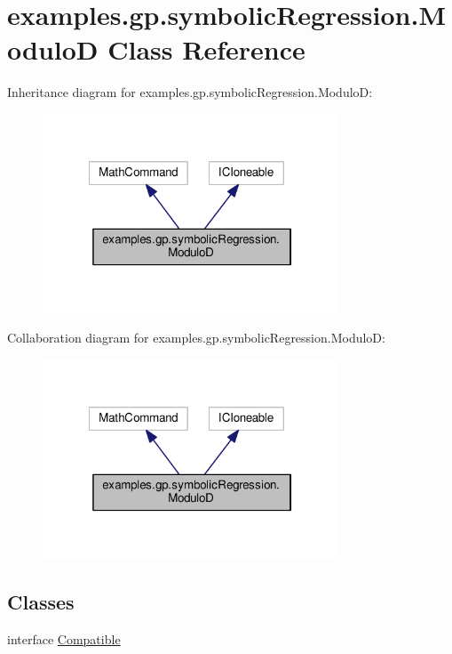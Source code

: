 \hypertarget{classexamples_1_1gp_1_1symbolic_regression_1_1_modulo_d}{\section{examples.\-gp.\-symbolic\-Regression.\-Modulo\-D Class Reference}
\label{classexamples_1_1gp_1_1symbolic_regression_1_1_modulo_d}
}


Inheritance diagram for examples.\-gp.\-symbolic\-Regression.\-Modulo\-D\-:
\nopagebreak
\begin{figure}[H]
\begin{center}
\leavevmode
\includegraphics[width=249pt]{classexamples_1_1gp_1_1symbolic_regression_1_1_modulo_d__inherit__graph}
\end{center}
\end{figure}


Collaboration diagram for examples.\-gp.\-symbolic\-Regression.\-Modulo\-D\-:
\nopagebreak
\begin{figure}[H]
\begin{center}
\leavevmode
\includegraphics[width=249pt]{classexamples_1_1gp_1_1symbolic_regression_1_1_modulo_d__coll__graph}
\end{center}
\end{figure}
\subsection*{Classes}
\begin{DoxyCompactItemize}
\item 
interface \hyperlink{interfaceexamples_1_1gp_1_1symbolic_regression_1_1_modulo_d_1_1_compatible}{Compatible}
\end{DoxyCompactItemize}
